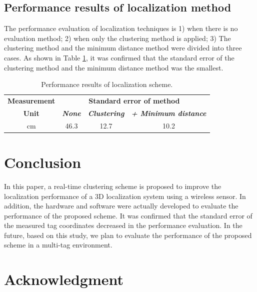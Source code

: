 \documentclass[conference]{IEEEtran}
\begin{document}
\subsection{Performance results of localization method}
The performance evaluation of localization techniques is 1) when there is no evaluation method; 2) when only the clustering method is applied; 3) The clustering method and the minimum distance method were divided into three cases. As shown in Table \ref{tab1}, it was confirmed that the standard error of the clustering method and the minimum distance method was the smallest.

\begin{table}[htbp]
    \caption{Performance results of localization scheme.}
    \begin{center}
        \begin{tabular}{|c|c|c|c|}
            \hline
            \textbf{Measurement} & \multicolumn{3}{|c|}{\textbf{Standard error of method}}                                                                       \\
            \cline{2-4}
            \textbf{Unit}        & \textbf{\textit{None}}                                  & \textbf{\textit{Clustering}} & \textbf{\textit{+ Minimum distance}} \\
            \hline
            cm                   & 46.3                                                    & 12.7                         & 10.2                                 \\
            \hline
        \end{tabular}
        \label{tab1}
    \end{center}
\end{table}

\section{Conclusion}

In this paper, a real-time clustering scheme is proposed to improve the localization performance of a 3D localization system using a wireless sensor. In addition, the hardware and software were actually developed to evaluate the performance of the proposed scheme. It was confirmed that the standard error of the measured tag coordinates decreased in the performance evaluation. In the future, based on this study, we plan to evaluate the performance of the proposed scheme in a multi-tag environment.

\section*{Acknowledgment}
\end{document}
